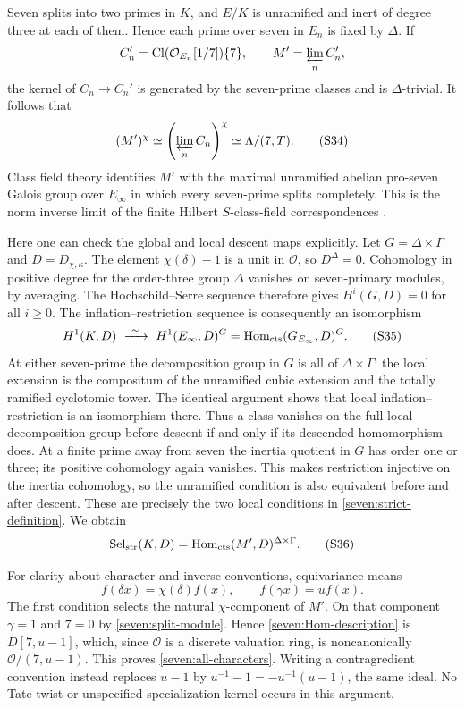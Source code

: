\documentclass[11pt]{article}
\begin{document}
Seven splits into two primes in $K$, and $E/K$ is unramified and inert of
degree three at each of them. Hence each prime over seven in $E_n$ is fixed
by $\Delta$.
If
\[
 C_n'=\operatorname{Cl}(\mathcal O_{E_n}[1/7])\{7\},
 \qquad M'=\varprojlim_n C_n',
\]
the kernel of $C_n\to C_n'$ is generated by the seven-prime classes and
is $\Delta$-trivial. It follows that
\[
 (M')^\chi
 \simeq\left(\varprojlim_n C_n\right)^\chi
 \simeq\Lambda/(7,T).
 \tag{S34}\label{seven:split-module}
\]
Class field theory identifies $M'$ with the maximal unramified abelian
pro-seven Galois group over $E_\infty$ in which every seven-prime splits
completely. This is the norm inverse limit of the finite Hilbert
$S$-class-field correspondences
\cite[Remark~1.3.21 and Proposition~3.2.20]{sevenSharifi}.

Here one can check the global and local descent maps explicitly.
Let $G=\Delta\times\Gamma$ and $D=D_{\chi,\kappa}$.
The element $\chi(\delta)-1$ is a unit in $\mathcal O$, so $D^\Delta=0$.
Cohomology in positive degree for the order-three group $\Delta$ vanishes
on seven-primary modules, by averaging.
The Hochschild--Serre sequence therefore gives
$H^i(G,D)=0$ for all $i\ge0$.
The inflation--restriction sequence is consequently an isomorphism
\[
 H^1(K,D)\ \xrightarrow{\ \sim\ }\
 H^1(E_\infty,D)^G
 =\operatorname{Hom}_{\rm cts}(G_{E_\infty},D)^G.
 \tag{S35}\label{seven:global-inflation}
\]
At either seven-prime the decomposition group in $G$ is all of
$\Delta\times\Gamma$: the local extension is the compositum of the
unramified cubic extension and the totally ramified cyclotomic tower.
The identical argument shows that local inflation--restriction is an
isomorphism there. Thus a class vanishes on the full local decomposition
group before descent if and only if its descended homomorphism does.
At a finite prime away from seven the inertia quotient in $G$ has order
one or three; its positive cohomology again vanishes. This makes
restriction injective on the inertia cohomology, so the unramified
condition is also equivalent before and after descent.
These are precisely the two local conditions in
\eqref{seven:strict-definition}. We obtain
\[
 \operatorname{Sel}_{\rm str}(K,D)
 =\operatorname{Hom}_{\rm cts}(M',D)^{\Delta\times\Gamma}.
 \tag{S36}\label{seven:Hom-description}
\]

For clarity about character and inverse conventions, equivariance means
\[
 f(\delta x)=\chi(\delta)f(x),\qquad f(\gamma x)=u f(x).
 \tag{S37}\label{seven:orientation}
\]
The first condition selects the natural $\chi$-component of $M'$.
On that component $\gamma=1$ and $7=0$ by \eqref{seven:split-module}.
Hence \eqref{seven:Hom-description} is $D[7,u-1]$, which, since
$\mathcal O$ is a discrete valuation ring, is noncanonically
$\mathcal O/(7,u-1)$.
This proves \eqref{seven:all-characters}.
Writing a contragredient convention instead replaces $u-1$ by
$u^{-1}-1=-u^{-1}(u-1)$, the same ideal. No Tate twist or unspecified
specialization kernel occurs in this argument.
\end{document}
